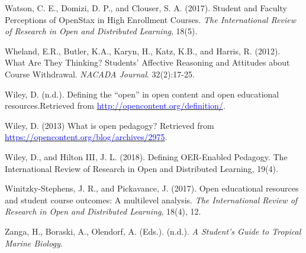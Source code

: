 \documentclass[11pt]{article}
\newcommand{\alink}[2]{\href{#1}{\textcolor{blue}{#2}}}
\begin{document}
\begin{thebibliography}{99}
   Watson, C. E., Domizi, D. P., and Clouser, S. A. (2017). Student and Faculty Perceptions of OpenStax in High Enrollment Courses. {\em The International Review of Research in Open and Distributed Learning}, 18(5). %

   Wheland, E.R., Butler, K.A., Karyn, H., Katz, K.B., and Harris, R. (2012). What Are They Thinking? Students' Affective Reasoning and Attitudes about Course Withdrawal. {\em NACADA Journal}. 32(2):17-25.

   Wiley, D. (n.d.). Defining the ``open'' in open content and open educational resources.\newline Retrieved from \alink{http://opencontent.org/definition/}{http://opencontent.org/definition/}.

   Wiley, D. (2013) What is open pedagogy? \newline Retrieved from \alink{https://opencontent.org/blog/archives/2975}{https://opencontent.org/blog/archives/2975}.

   Wiley, D., and Hilton III, J. L. (2018). Defining OER-Enabled Pedagogy. The International Review of Research in Open and Distributed Learning, 19(4).

   Winitzky-Stephens, J. R., and Pickavance, J. (2017). Open educational resources and student course outcomes: A multilevel analysis. {\em The International Review of Research in Open and Distributed Learning}, 18(4), 12.

   Zanga, H., Boraski, A., Olendorf, A. (Eds.). (n.d.). {\em A Student's Guide to Tropical Marine Biology}.

\end{thebibliography}
\end{document}
